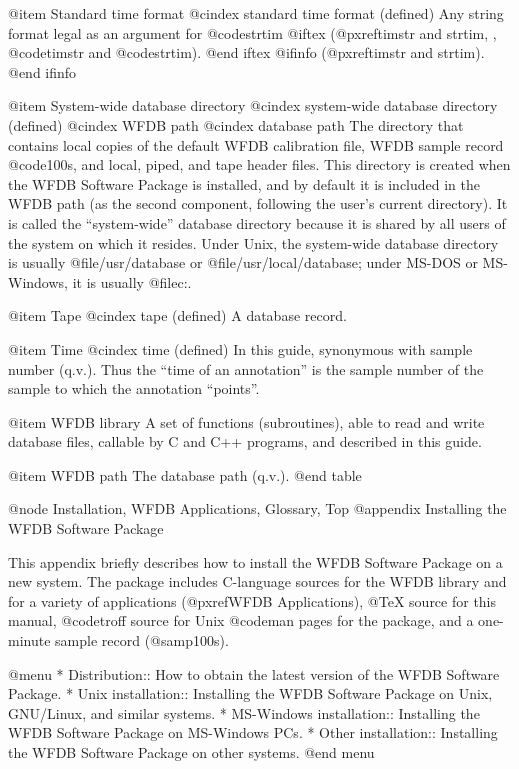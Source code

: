 {{{{{{{{{@item Standard time format
@cindex standard time format (defined)
Any string format legal as an argument for @code{strtim}
@iftex
(@pxref{timstr and strtim, , @code{timstr} and @code{strtim}}).
@end iftex
@ifinfo
(@pxref{timstr and strtim}).
@end ifinfo

@item System-wide database directory
@cindex system-wide database directory (defined)
@cindex WFDB path
@cindex database path
The directory that contains local copies of the default WFDB calibration file,
WFDB sample record @code{100s}, and local, piped, and tape header files.
This directory is created when the WFDB Software Package is installed, and
by default it is included in the WFDB path (as the second component, following
the user's current directory).  It is called the ``system-wide'' database
directory because it is shared by all users of the system on which it resides.
Under Unix, the system-wide database directory is usually @file{/usr/database}
or @file{/usr/local/database};  under MS-DOS or MS-Windows, it is usually
@file{c:\database}.

@item Tape
@cindex tape (defined)
A database record.

@item Time
@cindex time (defined)
In this guide, synonymous with sample number (q.v.).  Thus the ``time of
an annotation'' is the sample number of the sample to which the
annotation ``points''.

@item WFDB library
A set of functions (subroutines), able to read and write database files,
callable by C and C++ programs, and described in this guide.

@item WFDB path
The database path (q.v.).
@end table

@node     Installation, WFDB Applications, Glossary, Top
@appendix Installing the WFDB Software Package

This appendix briefly describes how to install the WFDB Software Package
on a new system.  The package includes C-language sources for the WFDB
library and for a variety of applications (@pxref{WFDB Applications}),
@TeX{} source for this manual, @code{troff} source for Unix @code{man}
pages for the package, and a one-minute sample record (@samp{100s}).

@menu
* Distribution::	How to obtain the latest version of the WFDB
			Software Package.
* Unix installation::	Installing the WFDB Software Package on Unix,
			GNU/Linux, and similar systems.
* MS-Windows installation::	Installing the WFDB Software Package on
                                MS-Windows PCs.
* Other installation::	Installing the WFDB Software Package on other systems.
@end menu

}}}}}}}}}
